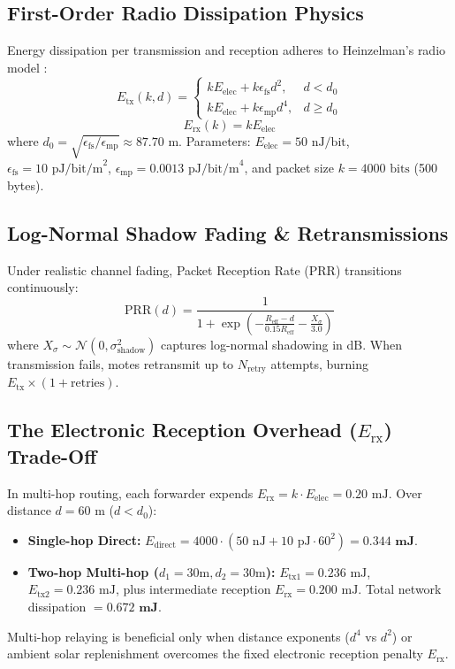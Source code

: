 \documentclass[conference]{IEEEtran}
\begin{document}
\subsection{First-Order Radio Dissipation Physics}
Energy dissipation per transmission and reception adheres to Heinzelman's radio model \cite{heinzelman2002application}:
\begin{equation}
E_{\text{tx}}(k, d) = 
\begin{cases}
k E_{\text{elec}} + k \epsilon_{\text{fs}} d^2, & d < d_0 \\
k E_{\text{elec}} + k \epsilon_{\text{mp}} d^4, & d \ge d_0
\end{cases}
\end{equation}
\begin{equation}
E_{\text{rx}}(k) = k E_{\text{elec}}
\end{equation}
where $d_0 = \sqrt{\epsilon_{\text{fs}} / \epsilon_{\text{mp}}} \approx 87.70\text{ m}$. Parameters: $E_{\text{elec}} = 50\text{ nJ/bit}$, $\epsilon_{\text{fs}} = 10\text{ pJ/bit/m}^2$, $\epsilon_{\text{mp}} = 0.0013\text{ pJ/bit/m}^4$, and packet size $k = 4000\text{ bits}$ (500 bytes).

\subsection{Log-Normal Shadow Fading \& Retransmissions}
Under realistic channel fading, Packet Reception Rate (PRR) transitions continuously:
\begin{equation}
\text{PRR}(d) = \frac{1}{1 + \exp\left( -\frac{R_{\text{eff}} - d}{0.15 R_{\text{eff}}} - \frac{X_\sigma}{3.0} \right)}
\end{equation}
where $X_\sigma \sim \mathcal{N}(0, \sigma_{\text{shadow}}^2)$ captures log-normal shadowing in dB. When transmission fails, motes retransmit up to $N_{\text{retry}}$ attempts, burning $E_{\text{tx}} \times (1 + \text{retries})$.

\subsection{The Electronic Reception Overhead ($E_{\text{rx}}$) Trade-Off}
In multi-hop routing, each forwarder expends $E_{\text{rx}} = k \cdot E_{\text{elec}} = 0.20\text{ mJ}$. Over distance $d = 60\text{ m}$ ($d < d_0$):
\begin{itemize}
    \item \textbf{Single-hop Direct:} $E_{\text{direct}} = 4000 \cdot (50\text{ nJ} + 10\text{ pJ} \cdot 60^2) = \mathbf{0.344\text{ mJ}}$.
    \item \textbf{Two-hop Multi-hop ($d_1 = 30\text{m}, d_2 = 30\text{m}$):} $E_{\text{tx1}} = 0.236\text{ mJ}$, $E_{\text{tx2}} = 0.236\text{ mJ}$, plus intermediate reception $E_{\text{rx}} = 0.200\text{ mJ}$. Total network dissipation $= \mathbf{0.672\text{ mJ}}$.
\end{itemize}
Multi-hop relaying is beneficial only when distance exponents ($d^4$ vs $d^2$) or ambient solar replenishment overcomes the fixed electronic reception penalty $E_{\text{rx}}$.
\end{document}

